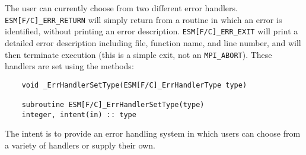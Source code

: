The user can currently choose from two different error handlers.
{\tt ESM[F/C]\_ERR\_RETURN} will simply return from a routine in which an error 
is identified, without printing an error description.
{\tt ESM[F/C]\_ERR\_EXIT} will print a detailed error description including
file, function name, and line number, and will then terminate execution
(this is a simple exit, not an {\tt MPI\_ABORT}).  These handlers are set 
using the methods: 
\begin{verbatim}
    void _ErrHandlerSetType(ESM[F/C]_ErrHandlerType type)

    subroutine ESM[F/C]_ErrHandlerSetType(type)
    integer, intent(in) :: type
\end{verbatim}

The intent is to provide an error handling system in which
users can choose from a variety of handlers or supply their own.






